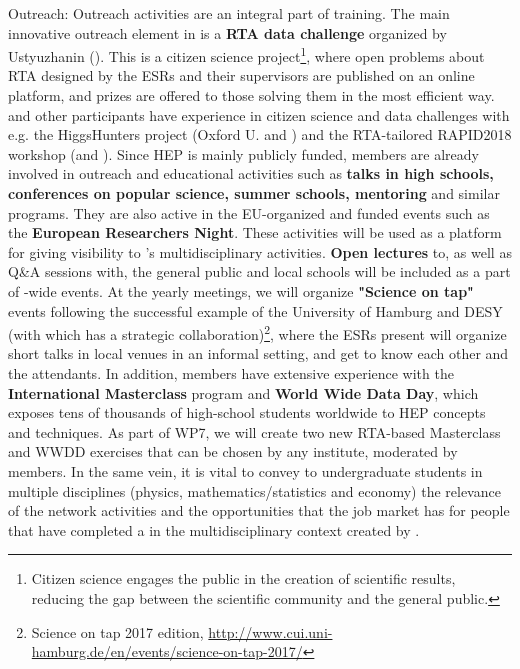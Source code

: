 {\color{blue}Outreach: \color{black} 
Outreach activities are an integral part of \acronym training.%
The main innovative outreach element in \acronym is a \textbf{RTA data challenge} organized by Ustyuzhanin (\cernentity). 
This is a citizen science project\footnote{Citizen science engages the public in the creation of scientific results, reducing the gap between the scientific community and the general public.}, where open problems about RTA designed by the ESRs and their supervisors are published on an online platform, and prizes are offered to those solving them in the most efficient way. \cernentity and other \acronym participants have experience in citizen science and data challenges with e.g. the HiggsHunters project (Oxford U. and \lundentity) and the RTA-tailored RAPID2018 workshop (\dortmundentity and \cnrsentity). 
Since HEP is mainly publicly funded, \acronym members are already involved in outreach and educational activities such as \textbf{talks in high schools, conferences on popular science, summer schools, mentoring} and similar programs. 
They are also active in the EU-organized and funded events such as the \textbf{European Researchers Night}. 
These activities will be used as a platform for giving visibility to \acronym's multidisciplinary activities. 
\textbf{Open lectures} to, as well as Q\&A sessions with, the general public and local schools will be included as a part of \acronym-wide events. 
At the yearly meetings, we will organize \textbf{"Science on tap"} events following the successful example of the University of Hamburg and DESY (with 
which \lundentity has a strategic collaboration)\footnote{Science on tap 2017 edition, \url{http://www.cui.uni-hamburg.de/en/events/science-on-tap-2017/}}, where the ESRs present will organize short talks in local venues in an informal setting, and get to know each other and the attendants.  
In addition, \acronym members have extensive experience with the \textbf{International Masterclass} program and \textbf{World Wide Data Day}, which exposes tens of thousands of high-school students worldwide to HEP concepts and techniques. 
As part of WP7, we will create two new RTA-based Masterclass and WWDD exercises that can be chosen by any institute, moderated by \acronym members.   
In the same vein, it is vital to convey to undergraduate students in multiple disciplines (physics, mathematics/statistics and economy) the relevance of the network activities and the opportunities that the job market has for people that have completed a \phd in the multidisciplinary context created by \acronym. 
}
